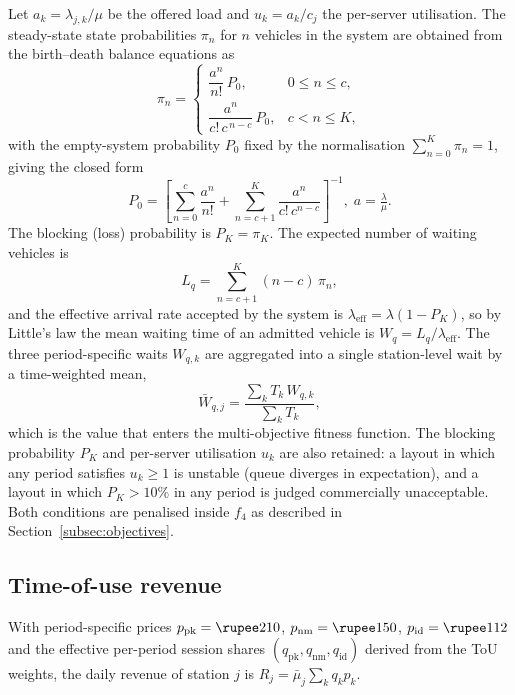 \documentclass[conference]{IEEEtran}
\begin{document}
Let $a_{k}\!=\!\lambda_{j,k}/\mu$ be the offered load and
$u_{k}\!=\!a_{k}/c_{j}$ the per-server utilisation. The
steady-state state probabilities $\pi_{n}$ for $n$ vehicles in the
system are obtained from the birth--death balance equations as
\begin{equation}
\label{eq:pi_n}
\pi_{n}=
\begin{cases}
\dfrac{a^{n}}{n!}\,P_{0}, & 0\le n\le c, \\[4pt]
\dfrac{a^{n}}{c!\,c^{\,n-c}}\,P_{0}, & c<n\le K,
\end{cases}
\end{equation}
with the empty-system probability $P_{0}$ fixed by the
normalisation $\sum_{n=0}^{K}\pi_{n}=1$, giving the closed form
\begin{equation}
\label{eq:mmck_p0}
P_{0}=\!\left[\sum_{n=0}^{c}\!\!\frac{a^{n}}{n!}
         +\!\sum_{n=c+1}^{K}\!\!\frac{a^{n}}{c!\,c^{n-c}}\right]^{-1}\!\!,\;a=\tfrac{\lambda}{\mu}.
\end{equation}
The blocking (loss) probability is $P_{K}=\pi_{K}$. The expected
number of waiting vehicles is
\begin{equation}
\label{eq:Lq}
L_{q}=\sum_{n=c+1}^{K}(n-c)\,\pi_{n},
\end{equation}
and the effective arrival rate accepted by the system is
$\lambda_{\text{eff}}=\lambda(1-P_{K})$, so by Little's law the mean
waiting time of an admitted vehicle is
$W_{q}=L_{q}/\lambda_{\text{eff}}$. The three period-specific waits
$W_{q,k}$ are aggregated into a single station-level wait by a
time-weighted mean,
\begin{equation}
\label{eq:bar_wq}
\bar W_{q,j}=\frac{\sum_{k}T_{k}\,W_{q,k}}{\sum_{k}T_{k}},
\end{equation}
which is the value that enters the multi-objective fitness
function. The blocking probability $P_{K}$ and per-server
utilisation $u_{k}$ are also retained: a layout in which any
period satisfies $u_{k}\!\ge\!1$ is unstable (queue diverges in
expectation), and a layout in which $P_{K}\!>\!10\%$ in any period
is judged commercially unacceptable. Both conditions are penalised
inside $f_{4}$ as described in Section~\ref{subsec:objectives}.

\subsection{Time-of-use revenue}
With period-specific prices
$p_{\text{pk}}=\text{\rupee}210$,
$p_{\text{nm}}=\text{\rupee}150$,
$p_{\text{id}}=\text{\rupee}112$ and the
effective per-period session shares $(q_{\text{pk}},q_{\text{nm}},
q_{\text{id}})$ derived from the ToU weights, the daily revenue of
station $j$ is
$R_{j}=\bar\mu_{j}\!\sum_{k}\!q_{k}p_{k}$.
\end{document}
